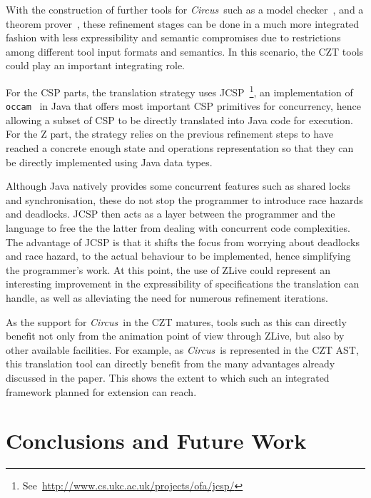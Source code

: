 \documentclass{llncs}
\newcommand{\Circus}{{\sf\slshape Circus}}
\begin{document}
With the construction of further tools for \Circus\ such as a model
checker~\cite{circus.mc:leo}, and a theorem
prover~\cite{circus.sem:pp}, these refinement stages can be done in a
much more integrated fashion with less expressibility and semantic
compromises due to restrictions among different tool input formats and
semantics.  In this scenario, the CZT tools could play an important
integrating role.

For the CSP parts, the translation strategy uses
JCSP~\footnote{See~\url{http://www.cs.ukc.ac.uk/projects/ofa/jcsp/}},
an implementation of \texttt{occam}~\cite{csp.tools:occam} in Java
that offers most important CSP primitives for concurrency, hence
allowing a subset of CSP to be directly translated into Java code for
execution.  For the Z part, the strategy relies on the previous
refinement steps to have reached a concrete enough state and
operations representation so that they can be directly implemented
using Java data types.

Although Java natively provides some concurrent features such as
shared locks and synchronisation, these do not stop the programmer to
introduce race hazards and deadlocks.  JCSP then acts as a layer
between the programmer and the language to free the the latter from
dealing with concurrent code complexities.  The advantage of JCSP is
that it shifts the focus from worrying about deadlocks and race
hazard, to the actual behaviour to be implemented, hence simplifying
the programmer's work.  At this point, the use of ZLive could
represent an interesting improvement in the expressibility of
specifications the translation can handle, as well as alleviating the
need for numerous refinement iterations.

As the support for \Circus\ in the CZT matures, tools such as this can
directly benefit not only from the animation point of view through
ZLive, but also by other available facilities.  For example, as
\Circus\ is represented in the CZT AST, this translation tool can
directly benefit from the many advantages already discussed in the
paper.  This shows the extent to which such an integrated framework
planned for extension can reach.

\section{Conclusions and Future Work} \label{sec:conclusions}



\end{document}
